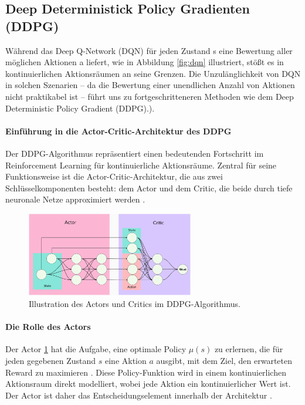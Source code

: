\subsection{Deep Deterministick Policy Gradienten (DDPG)}

Während das Deep Q-Network (DQN) für jeden Zustand s eine Bewertung aller möglichen Aktionen a liefert, wie in Abbildung \ref{fig:dqn} illustriert, stößt es in kontinuierlichen Aktionsräumen an seine Grenzen. Die Unzulänglichkeit von DQN in solchen Szenarien -- da die Bewertung einer unendlichen Anzahl von Aktionen nicht praktikabel ist -- führt uns zu fortgeschritteneren Methoden wie dem Deep Deterministic Policy Gradient (DDPG).\cite{morales2020grokking}).

\paragraph{Einführung in die Actor-Critic-Architektur des DDPG}

Der DDPG-Algorithmus repräsentiert einen bedeutenden Fortschritt im Reinforcement Learning für kontinuierliche Aktionsräume. Zentral für seine Funktionsweise ist die Actor-Critic-Architektur, die aus zwei Schlüsselkomponenten besteht: dem Actor und dem Critic, die beide durch tiefe neuronale Netze approximiert werden \cite{SuttonBarto2018}.


\begin{figure}[htbp]
\centering
\includegraphics[width=0.65\textwidth]{2Grundlagen/35Actor_Critick.png}
\caption{Illustration des Actors und Critics im DDPG-Algorithmus.}
\label{fig:actor_critick}
\end{figure}

\paragraph{Die Rolle des Actors}
Der Actor \ref{fig:actor_critick} hat die Aufgabe, eine optimale Policy \(\mu(s)\) zu erlernen, die für jeden gegebenen Zustand \(s\) eine Aktion \(a\) ausgibt, mit dem Ziel, den erwarteten Reward zu maximieren \cite{SuttonBarto2018}. Diese Policy-Funktion wird in einem kontinuierlichen Aktionsraum direkt modelliert, wobei jede Aktion ein kontinuierlicher Wert ist. Der Actor ist daher das Entscheidungselement innerhalb der Architektur \cite{SuttonBarto2018}.



